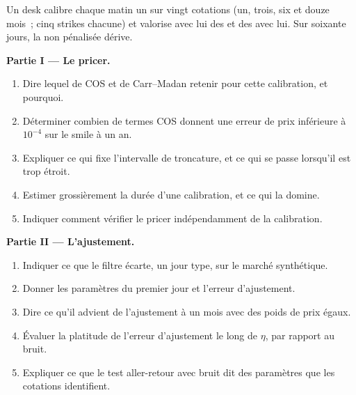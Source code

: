 \begin{problem}\label{pb:dv:fourier-pricing-and-calibration-engineering:1}
Un desk calibre chaque matin un  sur vingt cotations (un, trois, six et douze mois~; cinq strikes chacune) et valorise avec lui des 
et des  avec lui. Sur soixante jours, la  non pénalisée dérive.

\medskip\noindent\textbf{Partie I --- Le pricer.}
\begin{enumerate}
\item Dire lequel de COS et de Carr--Madan retenir pour cette calibration, et pourquoi.
\item Déterminer combien de termes COS donnent une erreur de prix inférieure à $10^{-4}$ sur le smile à un an.
\item Expliquer ce qui fixe l'intervalle de troncature, et ce qui se passe lorsqu'il est trop étroit.
\item Estimer grossièrement la durée d'une calibration, et ce qui la domine.
\item Indiquer comment vérifier le pricer indépendamment de la calibration.
\end{enumerate}

\medskip\noindent\textbf{Partie II --- L'ajustement.}
\begin{enumerate}[resume]
\item Indiquer ce que le filtre écarte, un jour type, sur le marché synthétique.
\item Donner les paramètres du premier jour et l'erreur d'ajustement.
\item Dire ce qu'il advient de l'ajustement à un mois avec des poids de prix égaux.
\item Évaluer la platitude de l'erreur d'ajustement le long de $\eta$, par rapport au bruit.
\item Expliquer ce que le test aller-retour avec bruit dit des paramètres que les cotations identifient.
\end{enumerate}


\end{problem}
